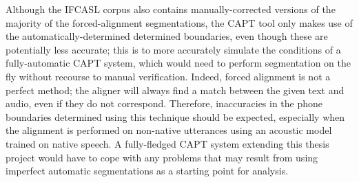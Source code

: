 	
	
	 Although the IFCASL corpus also contains manually-corrected versions of the majority of the forced-alignment segmentations,
	the CAPT tool only makes use of the automatically-determined determined boundaries, even though these are potentially less accurate; 
	this is to more accurately 
	simulate the conditions of a 
	fully-automatic CAPT system,
	which 
	would need to perform segmentation on the fly without recourse to manual verification.
	Indeed, 
	forced alignment is not a perfect method;  the aligner will always find a match between the given text and audio, even if they do not correspond.  
	Therefore, inaccuracies in the phone boundaries determined using this technique should be expected, especially when the alignment is performed on non-native utterances using an acoustic model trained on native speech.
		 A fully-fledged CAPT system extending this thesis project would have to cope with any problems that may result from using imperfect automatic segmentations as a starting point for analysis.
	
